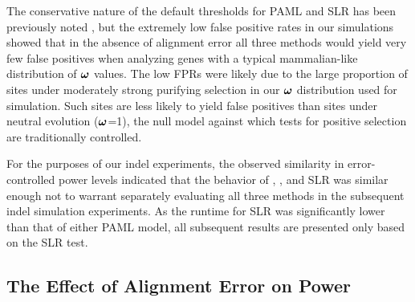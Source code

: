 \documentclass{article}
\begin{document}
The conservative nature of the default thresholds for PAML and SLR has
been previously noted
\citep{Anisimova2002Accuracy,Yang2005Bayes,Massingham2005Detecting},
but the extremely low false positive rates in our simulations showed
that in the absence of alignment error all three methods would yield
very few false positives when analyzing genes with a typical
mammalian-like distribution of $\bm{\omega}$ values. The low FPRs were likely
due to the large proportion of sites under moderately strong purifying
selection in our $\bm{\omega}$ distribution used for simulation. Such sites
are less likely to yield false positives than sites under neutral
evolution ($\bm{\omega}$=1), the null model against which tests for positive
selection are traditionally controlled.

For the purposes of our indel experiments, the observed similarity in
error-controlled power levels indicated that the behavior of \mtwo,
\meight, and SLR was similar enough not to warrant separately
evaluating all three methods in the subsequent indel simulation
experiments. As the runtime for SLR was significantly lower than that
of either PAML model, all subsequent results are presented only based
on the SLR test.

\subsection*{The Effect of Alignment Error on \Sw Power}
\end{document}
